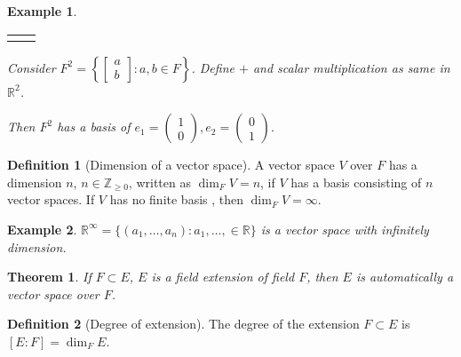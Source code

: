 \documentclass{article}
\theoremstyle{MyNonumberplain}
\theoremstyle{break}
\newcommand{\nline}{\begin{tabular}{ll}&\\\end{tabular}}
\theoremstyle{break}
\newtheorem{theorem}{Theorem}[section]
\newtheorem{example}{Example}[section]
\theoremstyle{break}
\theoremstyle{definition}
\theoremstyle{break}
\newtheorem{definition}{Definition}[section]
\begin{document}
\begin{expbox}
    \begin{example}

        \nline

        Consider $F^2 = \left\{ \left[\begin{array}{c}
            a\\
            b
          \end{array}\right] : a, b \in F \right\}$. Define $+$ and scalar
          multiplication as same in $\mathbb{R}^2$.
          
          Then $F^2$ has a basis of $e_1 = \left(\begin{array}{c}
            1\\
            0
          \end{array}\right), e_2 = \left(\begin{array}{c}
            0\\
            1
          \end{array}\right)$.
    \end{example}
\end{expbox}

\begin{defbox}
    \begin{definition}[Dimension of a vector space]
        A vector space $V$ over $F$ has a dimension $n$, $n \in \mathbb{Z}_{\geqslant
        0}$, written as $\dim_F V = n$, if $V$ has a basis consisting of $n$ vector
        spaces. If $V$ has no finite basis , then $\dim_F V = \infty$.
    \end{definition}
\end{defbox}

\begin{expbox}
    \begin{example}
            $\mathbb{R}^{\infty} = \{ (a_1, \ldots, a_n) : a_1, \ldots, \in \mathbb{R}
            \}$ is a vector space with infinitely dimension.
    \end{example}
\end{expbox}

\begin{thmbox}
    \begin{theorem}
        If $F \subset E$, $E$ is a field extension of field $F$, then $E$ is
        automatically a vector space over $F$.
    \end{theorem}
\end{thmbox}

\begin{defbox}
    \begin{definition}[Degree of extension]
        The degree of the extension $F \subset E$ is $[E : F] = \dim_F E$.
      \end{definition}
\end{defbox}
\end{document}
